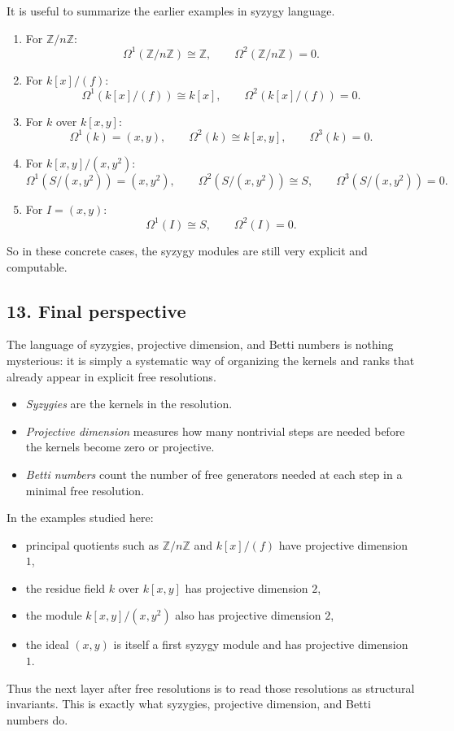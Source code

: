 \documentclass[12pt,a4paper]{article}
\theoremstyle{notespace}
\theoremstyle{definition}
\begin{document}
It is useful to summarize the earlier examples in syzygy language.

\begin{enumerate}
	\item For \(\mathbb Z/n\mathbb Z\):
	\[
	\Omega^1(\mathbb Z/n\mathbb Z)\cong \mathbb Z,\qquad \Omega^2(\mathbb Z/n\mathbb Z)=0.
	\]
	
	\item For \(k[x]/(f)\):
	\[
	\Omega^1(k[x]/(f))\cong k[x],\qquad \Omega^2(k[x]/(f))=0.
	\]
	
	\item For \(k\) over \(k[x,y]\):
	\[
	\Omega^1(k)=(x,y),\qquad \Omega^2(k)\cong k[x,y],\qquad \Omega^3(k)=0.
	\]
	
	\item For \(k[x,y]/(x,y^2)\):
	\[
	\Omega^1(S/(x,y^2))=(x,y^2),\qquad \Omega^2(S/(x,y^2))\cong S,\qquad \Omega^3(S/(x,y^2))=0.
	\]
	
	\item For \(I=(x,y)\):
	\[
	\Omega^1(I)\cong S,\qquad \Omega^2(I)=0.
	\]
\end{enumerate}

So in these concrete cases, the syzygy modules are still very explicit and computable.

\subsection{13. Final perspective}

The language of syzygies, projective dimension, and Betti numbers is nothing mysterious: it is simply a systematic way of organizing the kernels and ranks that already appear in explicit free resolutions.

\begin{itemize}
	\item \emph{Syzygies} are the kernels in the resolution.
	\item \emph{Projective dimension} measures how many nontrivial steps are needed before the kernels become zero or projective.
	\item \emph{Betti numbers} count the number of free generators needed at each step in a minimal free resolution.
\end{itemize}

In the examples studied here:
\begin{itemize}
	\item principal quotients such as \(\mathbb Z/n\mathbb Z\) and \(k[x]/(f)\) have projective dimension \(1\),
	\item the residue field \(k\) over \(k[x,y]\) has projective dimension \(2\),
	\item the module \(k[x,y]/(x,y^2)\) also has projective dimension \(2\),
	\item the ideal \((x,y)\) is itself a first syzygy module and has projective dimension \(1\).
\end{itemize}

Thus the next layer after free resolutions is to read those resolutions as structural invariants.
This is exactly what syzygies, projective dimension, and Betti numbers do.
\end{document}
